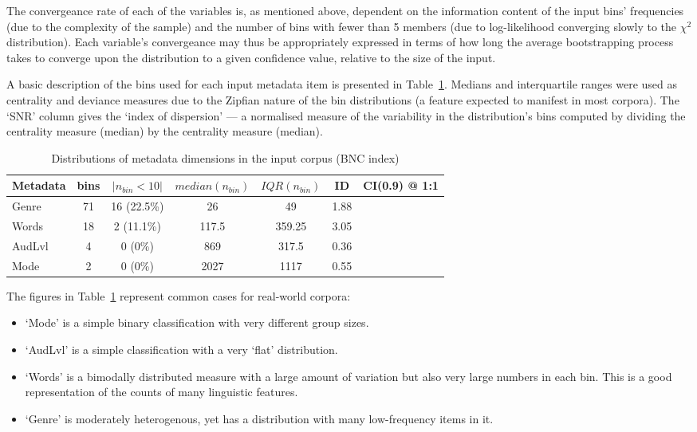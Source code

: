 The convergeance rate of each of the variables is, as mentioned above, dependent on the information content of the input bins' frequencies (due to the complexity of the sample) and the number of bins with fewer than 5 members (due to log-likelihood converging slowly to the $\chi^2$ distribution).  Each variable's convergeance may thus be appropriately expressed in terms of how long the average bootstrapping process takes to converge upon the distribution to a given confidence value, relative to the size of the input.

A basic description of the bins used for each input metadata item is presented in Table~\ref{table:evaluation:resampling:inputdist}.  Medians and interquartile ranges were used as centrality and deviance measures due to the Zipfian nature of the bin distributions (a feature expected to manifest in most corpora).  The `SNR' column gives the `index of dispersion' --- a normalised measure of the variability in the distribution's bins computed by dividing the centrality measure (median) by the centrality measure (median).

\begin{table}[Ht]
    \centering

    \begin{tabular}{ |l|c|c|c|c|c|c| }
        \hline
        Metadata & bins & $|n_{bin} < 10|$ & $median(n_{bin})$ & $IQR(n_{bin})$ & ID & CI(0.9) @ 1:1 \\
        \hline
        Genre & 71  & 16 (22.5\%)   & 26    & 49        & 1.88  &  \\
        Words & 18  & 2 (11.1\%)    & 117.5 & 359.25    & 3.05  &  \\
        AudLvl& 4   & 0 (0\%)       & 869   & 317.5     & 0.36  &  \\
        Mode  & 2   & 0 (0\%)       & 2027  & 1117      & 0.55  &  \\
        \hline
    \end{tabular}
    \caption{Distributions of metadata dimensions in the input corpus (BNC index)}
    \label{table:evaluation:resampling:inputdist}
\end{table}

The figures in Table~\ref{table:evaluation:resampling:inputdist} represent common cases for real-world corpora:

\begin{itemize}
    \item `Mode' is a simple binary classification with very different group sizes.
    \item `AudLvl' is a simple classification with a very `flat' distribution.
    \item `Words' is a bimodally distributed measure with a large amount of variation but also very large numbers in each bin.  This is a good representation of the counts of many linguistic features.
    \item `Genre' is moderately heterogenous, yet has a distribution with many low-frequency items in it.
\end{itemize}

